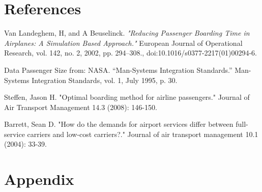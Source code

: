 \documentclass[11pt]{article}
\begin{document}
\section{References}
\begin{thebibliography}{9}
	Van Landeghem, H, and A Beuselinck. 
	\textit{"Reducing Passenger Boarding Time in Airplanes: A Simulation Based Approach."} 
	European Journal of Operational Research, vol. 142, no. 2, 2002, pp. 294–308.,
	doi:10.1016/s0377-2217(01)00294-6.
	
	Data Passenger Size from:  NASA. “Man-Systems Integration Standards.” Man-Systems Integration Standards, vol. 1, July 1995, p. 30.
	
	Steffen, Jason H. "Optimal boarding method for airline passengers." Journal of Air Transport Management 14.3 (2008): 146-150.

 Barrett, Sean D. "How do the demands for airport services differ between full-service carriers and low-cost carriers?." Journal of air transport management 10.1 (2004): 33-39.


\end{thebibliography}


\section{Appendix}
\end{document}

